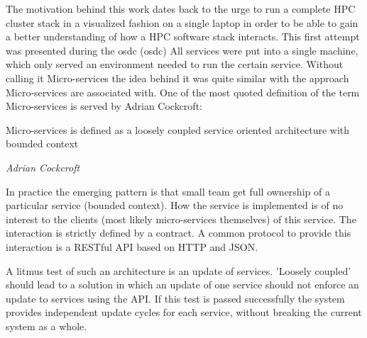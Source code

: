 The motivation behind this work dates back to the urge to run a complete HPC cluster stack in a visualized fashion on a single laptop in order to be able to gain a better understanding of how a HPC software stack interacts.
This first attempt was presented during the \gls{osdc} (\glsdesc{osdc}) 
All services were put into a single machine, which only served an environment needed to run the certain service.
Without calling it Micro-services the idea behind it was quite similar with the approach Micro-services are associated with.
One of the most quoted definition of the term Micro-services is served by Adrian Cockcroft:
\epigraph{Micro-services is defined as a loosely coupled service oriented architecture with bounded context}{\textit{Adrian Cockcroft}}
In practice the emerging pattern is that small team get full ownership of a particular service (bounded context).
How the service is implemented is of no interest to the clients (most likely micro-services themselves) of this service.
The interaction is strictly defined by a contract. A common protocol to provide this interaction is a RESTful API based on HTTP and JSON.

A litmus test of such an architecture is an update of services. 'Loosely coupled' should lead to a solution in which an update of one service
should not enforce an update to services using the API. If this test is passed successfully the system provides
independent update cycles for each service, without breaking the current system as a whole.
